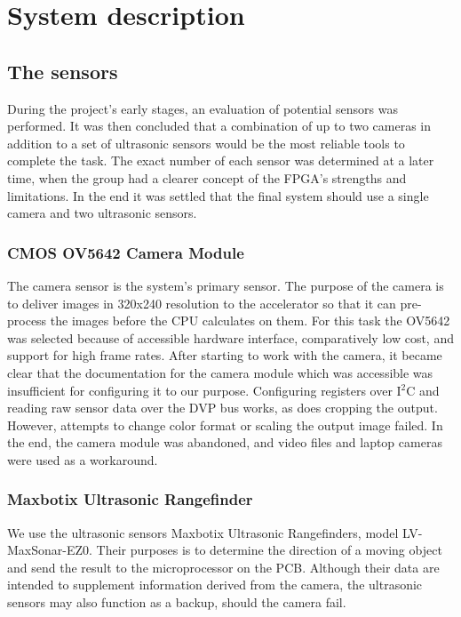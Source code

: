 
\section{System description}

\subsection{The sensors}
During the project's early stages, an evaluation of potential sensors was performed. It was then concluded that a combination of up to two cameras in addition to a set of ultrasonic sensors would be the most reliable tools to complete the task. The exact number of each sensor was determined at a later time, when the group had a clearer concept of the FPGA's strengths and limitations. In the end it was settled that the final system should use a single camera and two ultrasonic sensors. 

\subsubsection{CMOS OV5642 Camera Module }
The camera sensor is the system's primary sensor. The purpose of the camera is to deliver images in 320x240 resolution to the accelerator so that it can pre-process the images before the CPU calculates on them. For this task the OV5642 was selected because of accessible hardware interface, comparatively low cost, and support for high frame rates. After starting to work with the camera, it became clear that the documentation for the camera module which was accessible was insufficient for configuring it to our purpose. Configuring registers over I$^{2}$C and reading raw sensor data over the DVP bus works, as does cropping the output. However, attempts to change color format or scaling the output image failed. In the end, the camera module was abandoned, and video files and laptop cameras were used as a workaround.

\subsubsection{Maxbotix Ultrasonic Rangefinder}
We use the ultrasonic sensors Maxbotix Ultrasonic Rangefinders, model LV-MaxSonar-EZ0. Their purposes is to determine the direction of a moving object and send the result to the microprocessor on the PCB. Although their data are intended to supplement information derived from the camera, the ultrasonic sensors may also function as a backup, should the camera fail. 

